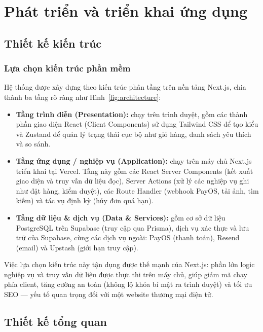 \chapter{Phát triển và triển khai ứng dụng}
\label{ch:dev}

\section{Thiết kế kiến trúc}

\subsection{Lựa chọn kiến trúc phần mềm}

Hệ thống \brandName{} được xây dựng theo kiến trúc phân tầng trên nền tảng Next.js, chia thành
ba tầng rõ ràng như Hình~\ref{fig:architecture}:

\begin{itemize}
  \item \textbf{Tầng trình diễn (Presentation):} chạy trên trình duyệt, gồm các thành phần giao
  diện React (Client Components) sử dụng Tailwind CSS để tạo kiểu và Zustand để quản lý trạng
  thái cục bộ như giỏ hàng, danh sách yêu thích và so sánh.
  \item \textbf{Tầng ứng dụng / nghiệp vụ (Application):} chạy trên máy chủ Next.js triển khai tại
  Vercel. Tầng này gồm các React Server Components (kết xuất giao diện và truy vấn dữ liệu đọc),
  Server Actions (xử lý các nghiệp vụ ghi như đặt hàng, kiểm duyệt), các Route Handler (webhook
  PayOS, tải ảnh, tìm kiếm) và tác vụ định kỳ (hủy đơn quá hạn).
  \item \textbf{Tầng dữ liệu \& dịch vụ (Data \& Services):} gồm cơ sở dữ liệu PostgreSQL trên
  Supabase (truy cập qua Prisma), dịch vụ xác thực và lưu trữ của Supabase, cùng các dịch vụ
  ngoài: PayOS (thanh toán), Resend (email) và Upstash (giới hạn truy cập).
\end{itemize}


Việc lựa chọn kiến trúc này tận dụng được thế mạnh của Next.js: phần lớn logic nghiệp vụ và truy
vấn dữ liệu được thực thi trên máy chủ, giúp giảm mã chạy phía client, tăng cường an toàn (không
lộ khóa bí mật ra trình duyệt) và tối ưu SEO --- yếu tố quan trọng đối với một website thương mại
điện tử.

\section{Thiết kế tổng quan}

